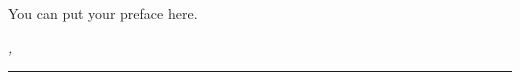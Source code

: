 %
\pagestyle{plain}

You can put your preface here.

\bigskip

\noindent\textit{\thesisUniversityCity, \thesisDate}

\smallskip

\begin{flushright}
	\begin{minipage}{5cm}
		\rule{\textwidth}{1pt}
		\centering\thesisFirstSupervisor
	\end{minipage}
\end{flushright}

